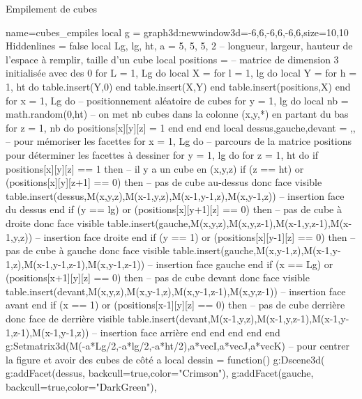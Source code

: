 \begin{demo}{Empilement de cubes}
\begin{luadraw}{name=cubes_empiles}
local g = graph3d:new{window3d={-6,6,-6,6,-6,6},size={10,10}}
Hiddenlines = false
local Lg, lg, ht, a = 5, 5, 5, 2 -- longueur, largeur, hauteur de l'espace à remplir, taille d'un cube
local positions = {} -- matrice de dimension 3 initialisée avec des 0
for L = 1, Lg do
    local X = {}
    for l = 1, lg do
        local Y = {}
        for h = 1, ht do table.insert(Y,0) end
        table.insert(X,Y)
    end
    table.insert(positions,X)
end
for x = 1, Lg do  -- positionnement aléatoire de cubes
    for y = 1, lg do
        local nb = math.random(0,ht) -- on met nb cubes dans la colonne (x,y,*) en partant du bas
        for z = 1, nb do positions[x][y][z] = 1 end
    end
end
local dessus,gauche,devant = {},{},{} -- pour mémoriser les facettes
for x = 1, Lg do -- parcours de la matrice positions pour déterminer les facettes à dessiner
    for y = 1, lg do
        for z = 1, ht do
            if positions[x][y][z] == 1 then -- il y a un cube en (x,y,z)
                if (z == ht) or (positions[x][y][z+1] == 0) then -- pas de cube au-dessus donc face visible
                    table.insert(dessus,{M(x,y,z),M(x-1,y,z),M(x-1,y-1,z),M(x,y-1,z)}) -- insertion face du dessus
                end
                if (y == lg) or (positions[x][y+1][z] == 0) then -- pas de cube à droite donc face  visible
                    table.insert(gauche,{M(x,y,z),M(x,y,z-1),M(x-1,y,z-1),M(x-1,y,z)}) -- insertion face droite
                end
                if (y == 1) or (positions[x][y-1][z] == 0) then -- pas de cube à gauche donc face visible
                    table.insert(gauche,{M(x,y-1,z),M(x-1,y-1,z),M(x-1,y-1,z-1),M(x,y-1,z-1)}) -- insertion face gauche
                end                    
                if (x == Lg) or (positions[x+1][y][z] == 0) then -- pas de cube devant donc face visible
                    table.insert(devant,{M(x,y,z),M(x,y-1,z),M(x,y-1,z-1),M(x,y,z-1)}) -- insertion face avant
                end
                if (x == 1) or (positions[x-1][y][z] == 0) then -- pas de cube derrière donc face de derrière visible
                    table.insert(devant,{M(x-1,y,z),M(x-1,y,z-1),M(x-1,y-1,z-1),M(x-1,y-1,z)}) -- insertion face arrière
                end
            end
        end
    end
end
g:Setmatrix3d({M(-a*Lg/2,-a*lg/2,-a*ht/2),a*vecI,a*vecJ,a*vecK}) -- pour centrer la figure et avoir des cubes de côté a
local dessin = function()
    g:Dscene3d(
        g:addFacet(dessus, {backcull=true,color="Crimson"}), g:addFacet(gauche, {backcull=true,color="DarkGreen"}),

\end{luadraw}
\end{demo}
